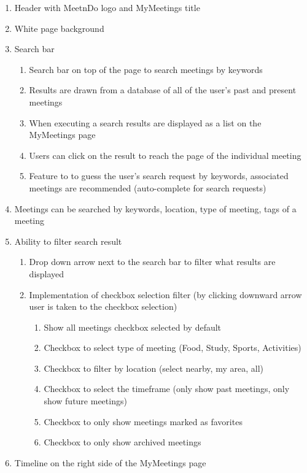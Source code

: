 \documentclass[conference]{IEEEtran}
\begin{document}
\begin{enumerate}
    \item Header with MeetnDo logo and MyMeetings title
    \item White page background
    \item Search bar
    \begin{enumerate}
        \item Search bar on top of the page to search meetings by keywords
        \item Results are drawn from a database of all of the user’s past and present meetings
        \item When executing a search results are displayed as a list on the MyMeetings page
        \item Users can click on the result to reach the page of the individual meeting
        \item Feature to to guess the user’s search request by keywords, associated meetings are recommended (auto-complete for search requests)
    \end{enumerate}
    \item Meetings can be searched by keywords, location, type of meeting, tags of a meeting
    \item Ability to filter search result
    \begin{enumerate}
        \item Drop down arrow next to the search bar to filter what results are displayed
        \item Implementation of checkbox selection filter (by clicking downward arrow user is taken to the checkbox selection)
        \begin{enumerate}
            \item Show all meetings checkbox selected by default
            \item Checkbox to select type of meeting (Food, Study, Sports, Activities)
            \item Checkbox to filter by location (select nearby, my area, all)
            \item Checkbox to select the timeframe (only show past meetings, only show future meetings)
            \item Checkbox to only show meetings marked as favorites
            \item Checkbox to only show archived meetings
        \end{enumerate}
    \end{enumerate}
    \item Timeline on the right side of the MyMeetings page

\end{enumerate}
\end{document}
